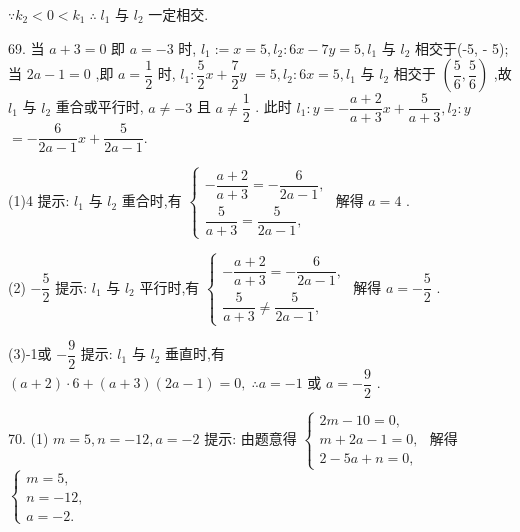 $\because {k}_{2} < 0 < {k}_{1}\;\therefore \;{l}_{1}$ 与 ${l}_{2}$ 一定相交.

69. 当 $a + 3 = 0$ 即 $a =  - 3$ 时, ${l}_{1} \mathrel{\text{ := }} x = 5,{l}_{2} : {6x} - {7y} = 5,{l}_{1}$ 与 ${l}_{2}$ 相交于(-5, - 5); 当 ${2a} - 1 = 0$ ,即 $a = \dfrac{1}{2}$ 时, ${l}_{1} : \dfrac{5}{2}x + \dfrac{7}{2}y$  $= 5,{l}_{2} : {6x} = 5,{l}_{1}$ 与 ${l}_{2}$ 相交于 $\left( {\dfrac{5}{6},\dfrac{5}{6}}\right)$ ,故 ${l}_{1}$ 与 ${l}_{2}$ 重合或平行时, $a \neq   - 3$ 且 $a \neq  \dfrac{1}{2}$ . 此时 ${l}_{1} : y =  - \dfrac{a + 2}{a + 3}x + \dfrac{5}{a + 3},{l}_{2} : y$  $=  - \dfrac{6}{{2a} - 1}x + \dfrac{5}{{2a} - 1}.$

(1)4 提示: ${l}_{1}$ 与 ${l}_{2}$ 重合时,有 $\left\{  \begin{array}{l}  - \dfrac{a + 2}{a + 3} =  - \dfrac{6}{{2a} - 1}, \\  \dfrac{5}{a + 3} = \dfrac{5}{{2a} - 1}, \end{array}\right.$ 解得 $a = 4$ .

(2) $- \dfrac{5}{2}$ 提示: ${l}_{1}$ 与 ${l}_{2}$ 平行时,有 $\left\{  \begin{array}{l}  - \dfrac{a + 2}{a + 3} =  - \dfrac{6}{{2a} - 1}, \\  \dfrac{5}{a + 3} \neq  \dfrac{5}{{2a} - 1}, \end{array}\right.$ 解得 $a =  - \dfrac{5}{2}$ .

(3)-1或 $- \dfrac{9}{2}$ 提示: ${l}_{1}$ 与 ${l}_{2}$ 垂直时,有 $\left( {a + 2}\right)  \cdot  6 + \left( {a + 3}\right) \left( {{2a} - 1}\right)  = 0,\;\therefore a =  - 1$ 或 $a =  - \dfrac{9}{2}$ .

70. (1) $m = 5,n =  - {12},a =  - 2$ 提示: 由题意得 $\left\{  \begin{array}{l} {2m} - {10} = 0, \\  m + {2a} - 1 = 0, \\  2 - {5a} + n = 0, \end{array}\right.$ 解得 $\left\{  \begin{array}{l} m = 5, \\  n =  - {12}, \\  a =  - 2. \end{array}\right.$

